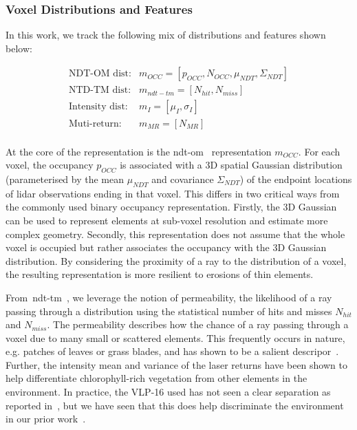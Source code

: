 \subsubsection{Voxel Distributions and Features}
\label{subsubsec:voxel_dist}
In this work, we track the following mix of distributions and features shown below: 

\begin{equation}
    \label{eq:dist}
      \begin{array}{ll}
        \textrm{NDT-OM dist:} & m_{OCC} = [p_{OCC}, N_{OCC}, \mu_{NDT}, \Sigma_{NDT}] \\
        \textrm{NTD-TM dist:} & m_{ndt-tm} = [N_{hit}, N_{miss}] \\
        \textrm{Intensity dist:} & m_{I} = [\mu_I ,\sigma_I] \\
        \textrm{Muti-return: } & m_{MR} = [N_{MR} ] \\
    \end{array} 
\end{equation}

At the core of the representation is the \ac{ndt-om}~\cite{saarinen2013normal} representation $m_{OCC}$. For each voxel, the occupancy $p_{OCC}$ is associated with a 3D spatial Gaussian distribution (parameterised by the mean $\mu_{NDT}$ and covariance $\Sigma_{NDT}$) of the endpoint locations of lidar observations ending in that voxel. This differs in two critical ways from the commonly used binary occupancy representation. Firstly, the 3D Gaussian can be used to represent elements at sub-voxel resolution and estimate more complex geometry. Secondly, this representation does not assume that the whole voxel is occupied but rather associates the occupancy with the 3D Gaussian distribution. By considering the proximity of a ray to the distribution of a voxel, the resulting representation is more resilient to erosions of thin elements. 

From~\ac{ndt-tm}~\cite{ahtiainen2017normal}, we leverage the notion of permeability, the likelihood of a ray passing through a distribution using the statistical number of hits and misses $N_{hit}$ and $N_{miss}$. The permeability describes how the chance of a ray passing through a voxel due to many small or scattered elements. This frequently occurs in nature, e.g. patches of leaves or grass blades, and has shown to be a salient descripor~\cite{ahtiainen2017normal}. Further, the intensity mean and variance of the laser returns have been shown to help differentiate chlorophyll-rich vegetation from other elements in the environment. In practice, the VLP-16 used has not seen a clear separation as reported in~\cite{ahtiainen2017normal}, but we have seen that this does help discriminate the environment in our prior work~\cite{ruetz2022FTM}. 

